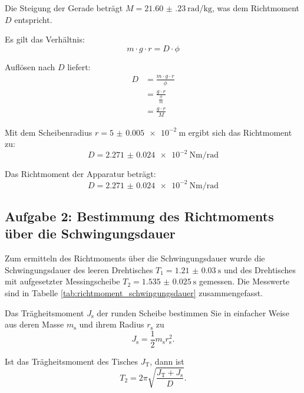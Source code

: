 \documentclass[12pt,a4paper,titlepage]{scrartcl}
\numberwithin{equation}{section}
\numberwithin{table}{section}
\numberwithin{figure}{section}
\begin{document}
Die Steigung der Gerade beträgt $M = \qty{21.60(23)}{\radian\per\kilo\gram}$, was dem Richtmoment $D$ entspricht.

Es gilt das Verhältnis:
\begin{equation}
    m \cdot g \cdot r = D \cdot \phi
\end{equation}

Auflösen nach $D$ liefert:
\begin{align}
    D &= \frac{m \cdot g \cdot r}{\phi}\\
    &= \frac{g \cdot r}{\frac{\phi}{m}}\\
    &= \frac{g \cdot r}{M}
\end{align}

Mit dem Scheibenradius $r = \qty{5(0.005)e-2}{\meter}$ ergibt sich das Richtmoment zu:
\begin{equation}
    D = \qty{2.271(24)e-2}{\newton\meter\per\radian}
\end{equation}


\begin{resultbox}
    Das Richtmoment der Apparatur beträgt:
    \begin{equation}
        D = \qty{2.271(24)e-2}{\newton\meter\per\radian}
    \end{equation}
\end{resultbox}

\bigskip
\subsection{Aufgabe 2: Bestimmung des Richtmoments über die Schwingungsdauer}
Zum ermitteln des Richtmoments über die Schwingungsdauer wurde die Schwingungsdauer des leeren Drehtisches $T_1 = \qty{1.21(3)}{\second}$ und des Drehtisches mit aufgesetzter Messingscheibe $T_2 = \qty{1.535(25)}{\second}$ gemessen. Die Messwerte sind in Tabelle \ref{tab:richtmoment_schwingungsdauer} zusammengefasst.


Das Trägheitsmoment $J_\text{s}$ der runden Scheibe bestimmen Sie in einfacher Weise aus deren Masse $m_\text{s}$ und ihrem Radius $r_\text{s}$ zu \cite{PAPskript}
\begin{equation}
J_\text{s} = \frac{1}{2} m_\text{s} r_\text{s}^2. \label{eq:Scheibe}
\end{equation}

Ist das Trägheitsmoment des Tisches $J_\text{T}$, dann ist
\begin{equation}
T_2 = 2\pi \sqrt{\frac{J_\text{T} + J_\text{s}}{D}}. \label{eq:Tisch+Platte}
\end{equation}
\end{document}

